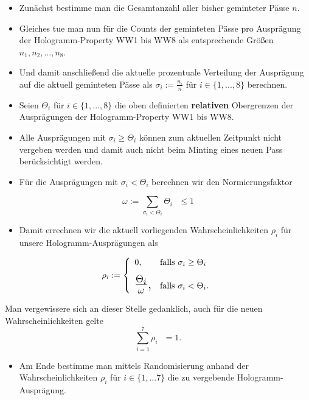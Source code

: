\begin{Algo}

\begin{itemize}
    \item Zunächst bestimme man die Gesamtanzahl aller bisher geminteter Pässe $n$.
    \item Gleiches tue man nun für die Counts der geminteten Pässe pro Ausprägung der Hologramm-Property WW1 bis WW8 als entsprechende Größen $n_1, n_2,...,n_8$.
    \item Und damit anschließend die aktuelle prozentuale Verteilung der Ausprägung auf die aktuell geminteten Pässe als $\sigma_i:= \frac{n_i}{n}$ für $i \in \lbrace 1,...,8 \rbrace$ berechnen.
    \item Seien $\Theta_i$ für $i \in \lbrace 1,...,8 \rbrace$ die oben definierten \textbf{relativen} Obergrenzen der \newline Ausprägungen der Hologramm-Property WW1 bis WW8.
    \item Alle Ausprägungen mit $\sigma_i \geq \Theta_i$ können zum aktuellen Zeitpunkt nicht vergeben werden und damit auch nicht beim Minting eines neuen Pass berücksichtigt werden.
    \item Für die Ausprägungen mit $\sigma_i < \Theta_i$ berechnen wir den Normierungsfaktor
\end{itemize} 

\begin{equation*}
\omega := \sum_{\sigma_i < \Theta_i} \Theta_i \textrm{ } \leq 1
\end{equation*} 

\begin{itemize}
    \item Damit errechnen wir die aktuell vorliegenden Wahrscheinlichkeiten $\rho_i$ für unsere Hologramm-Ausprägungen als
\end{itemize} 

\[
\rho_i:=\left\{%
\begin{array}{ll}
    0, & \hbox{falls $\sigma_i \geq \Theta_i$} \\[0,3cm]
    \hbox{\LARGE $\frac{\Theta_i}{\omega}$,} & \hbox{falls $\sigma_i < \Theta_i$}. \\
\end{array}%
\right.
\] 

Man vergewissere sich an dieser Stelle gedanklich, auch für die neuen \newline Wahrscheinlichkeiten gelte \[\sum_{i = 1}^7 \rho_i \textrm{ } = 1.\]

\begin{itemize}
    \item Am Ende bestimme man mittels Randomisierung anhand der Wahrscheinlichkeiten $\rho_i$ für $i \in \lbrace 1,...7 \rbrace$ die zu vergebende Hologramm-Ausprägung. 
\end{itemize}

\end{Algo}

\vspace{0.3cm}

